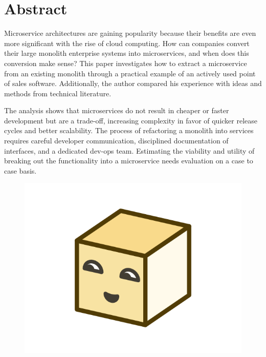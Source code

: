 \chapter*{Abstract}

Microservice architectures are gaining popularity because their benefits are even more significant with the rise of cloud computing. How can companies convert their large monolith enterprise systems into microservices, and when does this conversion make sense? This paper investigates how to extract a microservice from an existing monolith through a practical example of an actively used point of sales software. Additionally, the author compared his experience with ideas and methods from technical literature.

The analysis shows that microservices do not result in cheaper or faster development but are a trade-off, increasing complexity in favor of quicker release cycles and better scalability. The process of refactoring a monolith into services requires careful developer communication, disciplined documentation of interfaces, and a dedicated dev-ops team. Estimating the viability and utility of breaking out the functionality into a microservice needs evaluation on a case to case basis.

\begin{figure}[ht]
  \centering
  \includegraphics[width=0.25\linewidth]{assets/illustration-microservice-2.png}
\end{figure}
